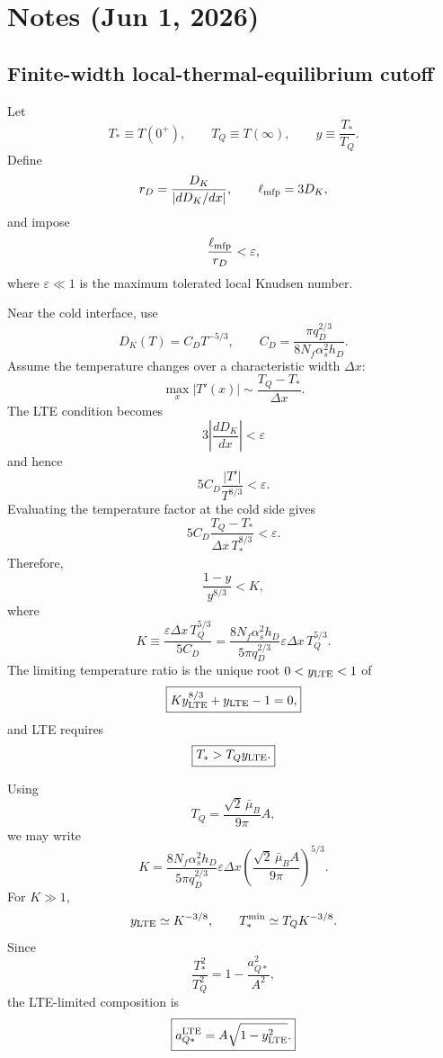 \documentclass[11pt]{article}
\newcommand{\JScom}[1]{\textsf{\color{violet} [\textsuperscript{JS}#1]}}
\begin{document}

\newpage

\section{Notes (Jun 1, 2026)}

\subsection{Finite-width local-thermal-equilibrium cutoff}

Let
\[
T_*\equiv T(0^+),\qquad T_Q\equiv T(\infty),\qquad
y\equiv\frac{T_*}{T_Q}.
\]
Define
\[
r_D=\frac{D_K}{|dD_K/dx|},\qquad
\ell_{\rm mfp}=3D_K,
\]
and impose
\[
\frac{\ell_{\rm mfp}}{r_D}<\varepsilon,
\]
where \(\varepsilon\ll1\) is the maximum tolerated local Knudsen number.

Near the cold interface, use
\[
D_K(T)=C_DT^{-5/3},\qquad
C_D=\frac{\pi q_D^{2/3}}{8N_f\alpha_s^2h_D}.
\]
Assume the temperature changes over a characteristic width \(\Delta x\):
\[
\max_x|T'(x)|\sim\frac{T_Q-T_*}{\Delta x}.
\]
The LTE condition becomes
\[
3\left|\frac{dD_K}{dx}\right|<\varepsilon
\]
and hence
\[
5C_D\frac{|T'|}{T^{8/3}}<\varepsilon.
\]
Evaluating the temperature factor at the cold side gives
\[
5C_D\frac{T_Q-T_*}{\Delta x\,T_*^{8/3}}<\varepsilon.
\]
Therefore,
\[
\frac{1-y}{y^{8/3}}<K,
\]
where
\[
\boxed{
K\equiv
\frac{\varepsilon\Delta x\,T_Q^{5/3}}{5C_D}
=
\frac{8N_f\alpha_s^2h_D}{5\pi q_D^{2/3}}
\varepsilon\Delta x\,T_Q^{5/3}.
}
\]
The limiting temperature ratio is the unique root \(0<y_{\rm LTE}<1\) of
\[
\boxed{Ky_{\rm LTE}^{8/3}+y_{\rm LTE}-1=0,}
\]
and LTE requires
\[
\boxed{T_*>T_Qy_{\rm LTE}.}
\]

Using
\[
T_Q=\frac{\sqrt{2}\,\bar\mu_B}{9\pi}A,
\]
we may write
\[
\boxed{
K=
\frac{8N_f\alpha_s^2h_D}{5\pi q_D^{2/3}}
\varepsilon\Delta x
\left(\frac{\sqrt{2}\,\bar\mu_BA}{9\pi}\right)^{5/3}.
}
\]
For \(K\gg1\),
\[
y_{\rm LTE}\simeq K^{-3/8},
\qquad
T_*^{\rm min}\simeq T_QK^{-3/8}.
\]
Since
\[
\frac{T_*^2}{T_Q^2}=1-\frac{a_{Q*}^2}{A^2},
\]
the LTE-limited composition is
\[
\boxed{
a_{Q*}^{\rm LTE}=A\sqrt{1-y_{\rm LTE}^2}.
}
\]
\end{document}
